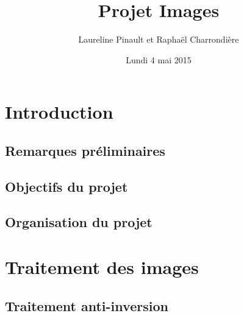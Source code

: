 \documentclass{article}
\title{Projet Images}
\author[$\dag$]{Laureline Pinault et Raphaël Charrondière}
\affil[$\dag$]{ENS de Lyon, France}
\date{Lundi 4 mai 2015}
\begin{document}
  \maketitle

  \begin{abstract}
   
  \end{abstract}
  
  \newpage

  \tableofcontents

  \newpage
  
  \section{Introduction}
  
    \subsection{Remarques préliminaires}
    
    \subsection{Objectifs du projet}
  
    \subsection{Organisation du projet}
  
  \section{Traitement des images}
  
    \subsection{Traitement anti-inversion}
    
\end{document}
